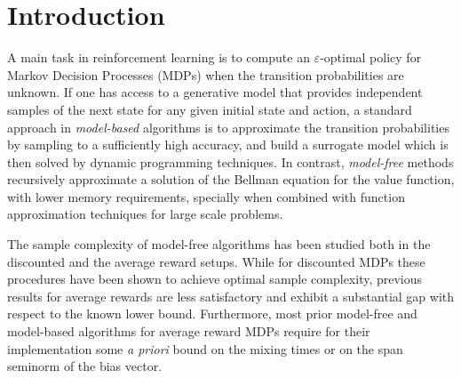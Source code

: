 \documentclass{article}
\newcommand{\cA}{\mathcal{A}}
\newcommand{\cS}{\mathcal{S}}
\renewcommand{\sp}[1]{\|{#1}\|_\text{\rm sp}}
\theoremstyle{plain}
\theoremstyle{definition}
\theoremstyle{remark}
\begin{document}
\printAffiliationsAndNotice{}  %


\begin{abstract}
We study a new model-free algorithm to compute  $\varepsilon$-optimal policies for average reward Markov decision processes, in the weakly communicating setting. Given a generative model, our procedure combines a recursive sampling technique with Halpern's anchored iteration, and computes an $\varepsilon$-optimal policy with sample and time complexity $\widetilde{O}(|\cS||\cA|\sp{h^*}^{2}/\varepsilon^{2})$ both in high probability and in expectation.  To our knowledge, this is the best complexity among model-free algorithms, matching the known lower bound up to a factor $\sp{h^*}$.  Although the complexity bound involves the span seminorm $\sp{h^*}$ of the unknown  bias vector, the algorithm requires no  prior knowledge  and  implements a stopping rule 
which guarantees  with probability 1 that the procedure terminates in finite time. We also analyze how these techniques can be adapted for discounted MDPs.
\end{abstract}


\section{Introduction}\label{intro}

A main task in reinforcement learning is to compute an $\varepsilon$-optimal policy for Markov Decision Processes (MDPs) when the transition probabilities are  unknown.
If one has access to a generative model that provides  independent samples of the next state for any given initial state and action, a standard approach in {\em model-based} algorithms is to  approximate the transition probabilities by sampling to a sufficiently high accuracy, and build a surrogate model which is then solved by dynamic programming techniques. In contrast, {\em model-free} methods recursively approximate a solution of the Bellman equation for the value function, with lower memory requirements, specially  when combined with function approximation techniques for large scale problems.

The sample complexity of model-free algorithms has been studied both in the discounted and the average reward setups. 
While for discounted MDPs these procedures have been shown to achieve optimal sample complexity, previous results for average rewards are less satisfactory and exhibit a substantial gap with respect to the known lower bound. Furthermore, most prior model-free and model-based algorithms for average reward MDPs require for their implementation
some {\em a priori} bound on the mixing times or on the span seminorm of the { bias vector}. 
\end{document}
